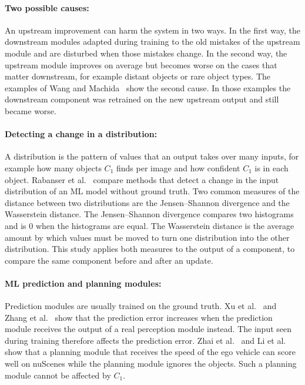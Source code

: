 \documentclass[11pt,a4paper]{article}
\begin{document}
\paragraph{Two possible causes:} An upstream improvement can harm the
system in two ways. In the first way, the downstream modules adapted during
training to the old mistakes of the upstream module and are disturbed when
those mistakes change. In the second way, the upstream module improves on
average but becomes worse on the cases that matter downstream, for example
distant objects or rare object types. The examples of Wang and
Machida~\cite{wang2025issre} show the second cause. In those examples the
downstream component was retrained on the new upstream output and still
became worse.

\paragraph{Detecting a change in a distribution:} A distribution is the
pattern of values that an output takes over many inputs, for example how
many objects $C_1$ finds per image and how confident $C_1$ is in each
object. Rabanser et al.~\cite{rabanser2019failing} compare methods that
detect a change in the input distribution of an ML model without ground
truth. Two common measures of the distance between two distributions are
the Jensen--Shannon divergence and the Wasserstein distance. The
Jensen--Shannon divergence compares two histograms and is $0$ when the
histograms are equal. The Wasserstein distance is the average amount by
which values must be moved to turn one distribution into the other
distribution. This study applies both measures to the output of a
component, to compare the same component before and after an update.

\paragraph{ML prediction and planning modules:} Prediction modules are
usually trained on the ground truth. Xu et al.~\cite{xu2024realworld} and
Zhang et al.~\cite{zhang2023towards} show that the prediction error
increases when the prediction module receives the output of a real
perception module instead. The input seen during training therefore
affects the prediction error. Zhai et al.~\cite{zhai2023rethinking} and Li
et al.~\cite{li2024egostatus} show that a planning module that receives
the speed of the ego vehicle can score well on nuScenes while the planning
module ignores the objects. Such a planning module cannot be affected by
$C_1$.
\end{document}
